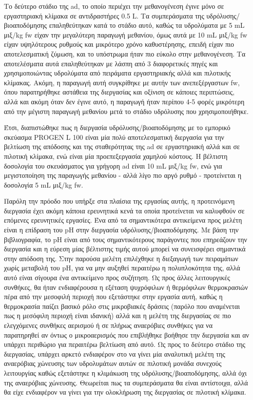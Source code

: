 \documentclass[11pt]{report}
\begin{document}
Το δεύτερο στάδιο της \acrshort{ad}, το οποίο περιέχει την μεθανογένεση έγινε μόνο σε εργαστηριακή κλίμακα σε αντιδραστήρες 0.5 L. Τα συμπεράσματα της υδρόλυσης/βιοαποδόμησης επαληθεύτηκαν κατά το στάδιο αυτό, καθώς τα υδρολύματα με 5 mL μιξ/kg \acrshort{fw} είχαν την μεγαλύτερη παραγωγή μεθανίου, όμως αυτά με 10 mL μιξ/kg \acrshort{fw} είχαν υψηλότερους ρυθμούς και μικρότερο χρόνο καθυστέρησης, επειδή είχαν πιο αποτελεσματική ζύμωση, και το υπόστρωμα ήταν πιο εύκολο στην μεθανογένεση. Τα αποτελέσματα αυτά επαληθεύτηκαν με λάσπη από 3 διαφορετικές πηγές και χρησιμοποιώντας υδρολύματα από πειράματα εργαστηριακής αλλά και πιλοτικής κλίμακας. Ακόμη, η παραγωγή αυτή συγκρίθηκε με αυτήν των ανεπεξέργαστων \acrshort{fw}, όπου παρατηρήθηκε αστάθεια της διεργασίας και οξίνιση σε κάποιες περιπτώσεις, αλλά και ακόμη όταν δεν έγινε αυτό, η παραγωγή ήταν περίπου 4-5 φορές μικρότερη από την μέγιστη παραγωγή μεθανίου μετά το στάδιο υδρόλυσης που χρησιμοποιήθηκε.

Έτσι, διαπιστώθηκε πως η διεργασία υδρόλυσης/βιοαποδόμησης με το εμπορικό σκεύασμα PROGEN L 100 είναι μία πολύ αποτελεσματική διεργασία για την βελτίωση της απόδοσης και της σταθερότητας της \acrshort{ad} σε εργαστηριακή αλλά και σε πιλοτική κλίμακα, ενώ είναι μία προεπεξεργασία χαμηλού κόστους. Η βέλτιστη δοσολογία του σκευάσματος για γρήγορη \acrshort{ad} είναι 10 mL μιξ/kg \acrshort{fw}, ενώ για μεγιστοποίηση της παραγωγής μεθανίου - αλλά λίγο πιο αργό ρυθμό - προτείνεται η δοσολογία 5 mL μιξ/kg \acrshort{fw}.

Παρόλη την πρόοδο που υπήρξε στα πλαίσια της εργασίας αυτής, η προτεινόμενη διεργασία έχει ακόμη κάποια ερευνητικά κενά τα οποία προτείνεται να καλυφθούν σε επόμενες ερευνητικές εργασίες. Ένα από τα σημαντικότερα αντικείμενα προς μελέτη είναι η επίδραση του pH στην διεργασία υδρόλυσης/βιοαποδόμησης. Με βάση την βιβλιογραφία, το pH είναι από τους σημαντικότερους παράγοντες που επηρεάζουν την διεργασία και η εύρεση μίας βέλτιστης τιμής αυτού μπορεί να συνεισφέρει σημαντικά στην απόδοση της. Στην παρούσα μελέτη επιλέχθηκε η διεξαγωγή των πειραμάτων χωρίς μεταβολή του pH, για να μην αυξηθεί περαιτέρω η πολυπλοκότητα της, αλλά αυτό είναι σίγουρα ένα αντικείμενο προς συζήτηση. Ως προς άλλες λειτουργικές συνθήκες, θα ήταν ενδιαφέρουσα η εξέταση ψυχρόφιλων ή θερμόφιλων θερμοκρασιών πέρα από την μεσοφιλή περιοχή που εξετάστηκε στην εργασία αυτή, καθώς η θερμοκρασία παίζει βασικό ρόλο στις μικροβιακές δράσεις (παρόλο που αναμένεται πως η μεσόφιλη περιοχή είναι ιδανική) αλλά και η μελέτη της διεργασίας σε πιο ελεγχόμενες συνθήκες αερισμού ή σε πλήρως αναερόβιες συνθήκες για να παρατηρηθεί αν όντως ο μικροαερισμός που επιβλήθηκε βοήθησε την διεργασία και αν υπάρχει περιθώριο για περαιτέρω βελτίωση από αυτό. Ως προς το δεύτερο στάδιο της διεργασίας, υπάρχει αρκετό ενδιαφέρον στο να γίνει μία αναλυτική μελέτη της αναερόβιας χώνευσης των υδρολυμάτων αυτών σε πιλοτική μονάδα συνεχούς λειτουργίας καθώς εξετάστηκε η κλιμάκωση της υδρόλυσης/βιοαποδόμησης, αλλά όχι της αναερόβιας χώνευσης. Θεωρείται πως τα συμπεράσματα θα είναι αντίστοιχα, αλλά θα είχε ενδιαφέρον να γίνει για την ολοκλήρωση της διεργασίας σε πιλοτική κλίμακα. 
\end{document}
